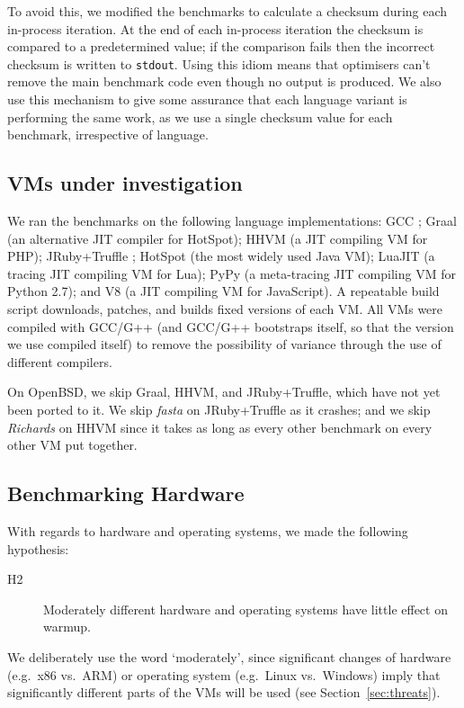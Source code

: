 \documentclass[preprint,numbers,10pt]{sigplanconf}
\newcommand{\hyptwo}{H2\xspace}
\newcommand{\richards}{\emph{Richards}\xspace}
\newcommand{\fasta}{\emph{fasta}\xspace}
\begin{document}
To avoid this, we modified the benchmarks to calculate a checksum
during each in-process iteration. At the end of each in-process iteration
the checksum is compared to a predetermined value; if the comparison fails then
the incorrect checksum is written to \texttt{stdout}. Using this idiom
means that optimisers can't remove the main benchmark code even though
no output is produced. We also use this mechanism to give some assurance
that each language variant is performing the same work, as we use a single
checksum value for each benchmark, irrespective of language.


\subsection{VMs under investigation}

We ran the benchmarks on the following language implementations: GCC \gccversion;
Graal \graalversion (an alternative JIT compiler for HotSpot); HHVM \hhvmversion (a JIT
compiling VM for PHP); JRuby+Truffle \jrubytruffleversion{};
HotSpot \hotspotversion (the most widely used Java
VM); LuaJIT \luajitversion (a tracing JIT compiling VM for Lua); PyPy \pypyversion (a
meta-tracing JIT compiling VM for Python 2.7); and V8 \veightversion (a JIT
compiling VM for JavaScript). A repeatable build script downloads, patches,
and builds fixed versions of each VM. All VMs were compiled with GCC/G++ \gccversion
(and GCC/G++ bootstraps itself, so that the version we use compiled itself)
to remove the possibility of variance through the use of different compilers.

\label{openbsd porting} On OpenBSD, we skip Graal, HHVM, and JRuby+Truffle, which have not yet been
ported to it. We skip \fasta on JRuby+Truffle as it crashes;
and we skip \richards on HHVM since it takes as long as every other benchmark
on every other VM put together.


\subsection{Benchmarking Hardware}

With regards to hardware and operating systems, we made the
following hypothesis:
\begin{description}
  \item[\hyptwo] Moderately different hardware and operating systems have little effect on warmup.
\end{description}
We deliberately use the word `moderately', since significant changes of hardware
(e.g.~x86 vs.~ARM) or operating system (e.g.~Linux vs.~Windows) imply that
significantly different parts of the VMs will be used (see Section~\ref{sec:threats}).
\end{document}
